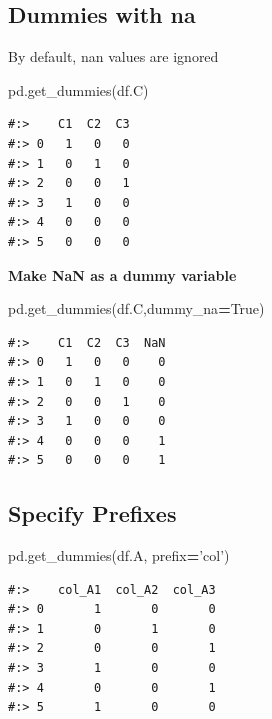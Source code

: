 \documentclass[
]{book}
\newenvironment{Shaded}{\begin{snugshade}}{\end{snugshade}}
\newcommand{\NormalTok}[1]{#1}
\newcommand{\OperatorTok}[1]{\textcolor[rgb]{0.43,0.43,0.43}{\textbf{#1}}}
\newcommand{\StringTok}[1]{\textcolor[rgb]{0.5,0.5,0.5}{#1}}
\newcommand{\VariableTok}[1]{\textcolor[rgb]{0,0,0}{#1}}
\begin{document}
\hypertarget{dummies-with-na}{%
\subsection{Dummies with na}\label{dummies-with-na}}

By default, nan values are ignored

\begin{Shaded}
\begin{Highlighting}[]
\NormalTok{pd.get_dummies(df.C)}
\end{Highlighting}
\end{Shaded}

\begin{verbatim}
#:>    C1  C2  C3
#:> 0   1   0   0
#:> 1   0   1   0
#:> 2   0   0   1
#:> 3   1   0   0
#:> 4   0   0   0
#:> 5   0   0   0
\end{verbatim}

\textbf{Make NaN as a dummy variable}

\begin{Shaded}
\begin{Highlighting}[]
\NormalTok{pd.get_dummies(df.C,dummy_na}\OperatorTok{=}\VariableTok{True}\NormalTok{)}
\end{Highlighting}
\end{Shaded}

\begin{verbatim}
#:>    C1  C2  C3  NaN
#:> 0   1   0   0    0
#:> 1   0   1   0    0
#:> 2   0   0   1    0
#:> 3   1   0   0    0
#:> 4   0   0   0    1
#:> 5   0   0   0    1
\end{verbatim}

\hypertarget{specify-prefixes}{%
\subsection{Specify Prefixes}\label{specify-prefixes}}

\begin{Shaded}
\begin{Highlighting}[]
\NormalTok{pd.get_dummies(df.A, prefix}\OperatorTok{=}\StringTok{'col'}\NormalTok{)}
\end{Highlighting}
\end{Shaded}

\begin{verbatim}
#:>    col_A1  col_A2  col_A3
#:> 0       1       0       0
#:> 1       0       1       0
#:> 2       0       0       1
#:> 3       1       0       0
#:> 4       0       0       1
#:> 5       1       0       0
\end{verbatim}
\end{document}

